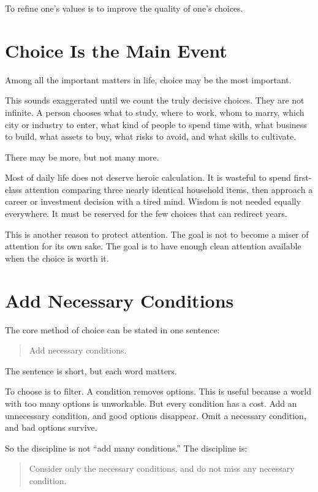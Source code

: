 To refine one's values is to improve the quality of one's choices.

\section*{Choice Is the Main Event}

Among all the important matters in life, choice may be the most important.

This sounds exaggerated until we count the truly decisive choices. They are not infinite. A person chooses what to study, where to work, whom to marry, which city or industry to enter, what kind of people to spend time with, what business to build, what assets to buy, what risks to avoid, and what skills to cultivate.

There may be more, but not many more.

Most of daily life does not deserve heroic calculation. It is wasteful to spend first-class attention comparing three nearly identical household items, then approach a career or investment decision with a tired mind. Wisdom is not needed equally everywhere. It must be reserved for the few choices that can redirect years.

This is another reason to protect attention. The goal is not to become a miser of attention for its own sake. The goal is to have enough clean attention available when the choice is worth it.

\section*{Add Necessary Conditions}

The core method of choice can be stated in one sentence:

\begin{quote}
Add necessary conditions.
\end{quote}

The sentence is short, but each word matters.

To choose is to filter. A condition removes options. This is useful because a world with too many options is unworkable. But every condition has a cost. Add an unnecessary condition, and good options disappear. Omit a necessary condition, and bad options survive.

So the discipline is not ``add many conditions.'' The discipline is:

\begin{quote}
Consider only the necessary conditions, and do not miss any necessary condition.
\end{quote}


